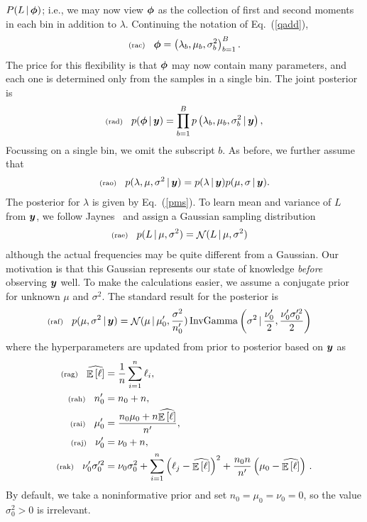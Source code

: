 \documentclass[11pt]{article}
\newcommand{\lleq}[1]{\label{#1} }
\renewcommand{\lleq}[1]{\label{#1} {\scriptstyle {\rm (#1)}} \hspace*{2ex} }
\newcommand{\cond}{\,|\,}
\newcommand{\refeq}[1]{Eq.~(\ref{#1})}
\DeclareMathOperator{\Expect}{\mathbb{E}}
\newcommand{\expect}[1]{\Expect\left[#1\right]}
\newcommand{\expectest}[1]{\widehat{\Expect\left[#1\right]}}
\DeclareMathOperator{\GaussianDist}{\mathcal{N}}
\DeclareMathOperator{\InvGammaDist}{InvGamma}
\newcommand{\Lum}{L}
\newcommand{\lum}{\ell}
\begin{document}
$P(\Lum \cond \bmphi)$; i.e., we may now view ${\bm{\phi}}$ as the
collection of first and second moments in each bin in addition to
$\lambda$. Continuing the notation of \refeq{qadd},
\begin{align}
  \lleq{rac}
  \bmphi =  \left(\lambda_b, \mu_b, \sigma^2_b \right)_{b=1}^B.
\end{align}
The price for this flexibility is that ${\bm{\phi}}$ may now contain many
parameters, and each one is determined only from the samples in a
single bin. The joint posterior is
\begin{align}
  \lleq{rad}
  p(\bmphi \cond \bmy ) = \prod_{b=1}^B p\left(\lambda_b, \mu_b, \sigma^2_b \cond \bmy\right),
\end{align}
Focussing on a single bin, we omit the subscript $b$. As before, we
further assume that
\begin{align}
  \lleq{rao}
p(\lambda, \mu, \sigma^2 \cond \bmy) = p(\lambda \cond \bmy) p(\mu,
\sigma \cond \bmy).
\end{align}
The posterior for $\lambda$ is given by \refeq{pms}.  To learn mean
and variance of $\Lum$ from ${\bm{y}}$, we follow
Jaynes~\cite[Ch. 7.10]{jaynes2003probability} and assign a Gaussian
sampling distribution
\begin{align}
  \lleq{rae}
  p(\Lum \cond \mu, \sigma^2 ) &= \GaussianDist(\Lum \cond \mu, \sigma^2)
\end{align}
although the actual frequencies may be quite different from a
Gaussian. Our motivation is that this Gaussian represents our state of
knowledge \emph{before} observing ${\bm{y}}$ well. To make the
calculations easier, we assume a conjugate prior for unknown $\mu$ and
$\sigma^2$. The standard result for the posterior is
\begin{align}
  \lleq{raf}
  p(\mu, \sigma^2 \cond \bmy) &= \GaussianDist(\mu \cond \mu_0^\prime, \frac{\sigma^2}{n_0^\prime}) \InvGammaDist\left( \sigma^2 \cond \frac{\nu_0^\prime}{2}, \frac{\nu_0^\prime \sigma_0^{\prime 2}}{2} \right)
\end{align}
where the hyperparameters are updated from prior to posterior based on ${\bm{y}}$ as
\begin{align}
  \lleq{rag}
  \expectest{\lum} &= \frac{1}{n} \sum_{i=1}^n \lum_i,\\
  \lleq{rah}  n_0^\prime &= n_0 + n,\\
  \lleq{rai}    \mu_0^\prime &= \frac{n_0 \mu_0 + n \expectest{\lum}}{n^\prime},\\
  \lleq{raj}    \nu_0^\prime &= \nu_0 + n,\\
  \lleq{rak}    \nu_0^\prime \sigma_0^{\prime 2} &= \nu_0 \sigma_0^{ 2} + \sum_{i=1}^n \left(\lum_j - \expectest{\lum}\right)^2 + \frac{n_0 n}{n^\prime} \left(\mu_0 - \expectest{\lum}\right)\,.
  \end{align}
  By default, we take a noninformative prior and set
  $n_0 = \mu_0 = \nu_0 = 0$, so the value $\sigma_0^2>0$ is
  irrelevant.
\end{document}
